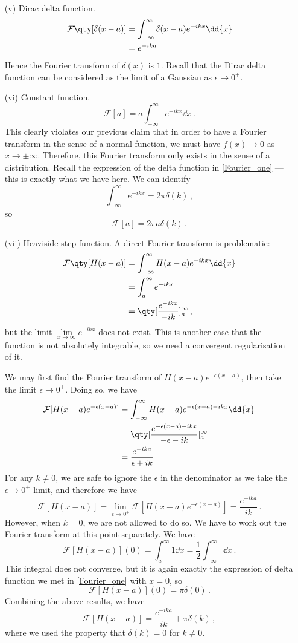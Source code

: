 \documentclass{article}
\theoremstyle{plain}\theoremheaderfont{\normalfont\itshape}\theorembodyfont{\rmfamily}\theoremseparator{.}\newtheorem*{rem}{Remark}\newtheorem*{ex}{Example}\newtheorem*{proof}{Proof}\newtheorem*{altp}{Alternative proof}
\theoremstyle{plain}\theoremheaderfont{\normalfont\bfseries}\theorembodyfont{\rmfamily}\theoremseparator{.}\newtheorem{thm}{Theorem}[section]\newtheorem{lem}[thm]{Lemma}\newtheorem{prop}[thm]{Proposition}\newtheorem*{cor}{Corollary}\newtheorem{defn}[thm]{Definition}\newtheorem{clm}[thm]{Claim}\newtheorem{clminproof}{Claim}
\theoremstyle{break}\theoremheaderfont{\normalfont\itshape}\theorembodyfont{\rmfamily}\theoremseparator{.\medskip}\newtheorem*{proofskip}{Proof}\newtheorem*{exs}{Examples}\newtheorem*{rems}{Remarks}
\theoremstyle{break}\theoremheaderfont{\normalfont\bfseries}\theorembodyfont{\rmfamily}\theoremseparator{.\medskip}\newtheorem{lemskip}[thm]{Lemma}\newtheorem{defnskip}[thm]{Definition}\newtheorem{propskip}[thm]{Proposition}\newtheorem{thmskip}[thm]{Theorem}
\numberwithin{equation}{section}
\begin{document}
\begin{itemize}
		\item[(v)] Dirac delta function.
		\begin{align*}
			\mathcal{F}\qty[\delta(x-a)]&=\int_{-\infty}^{\infty}\delta(x-a)e^{-ikx}\dd{x}\\
			&=e^{-ika}			
		\end{align*}
		Hence the Fourier transform of \(\delta(x)\) is \(1\). Recall that the Dirac delta function can be considered as the limit of a Gaussian as \(\epsilon\to 0^+\).

		\item[(vi)] Constant function.
		\[\mathcal{F}[a]=a\int_{-\infty}^{\infty}e^{-ikx}\dd{x}\,.\]
		This clearly violates our previous claim that in order to have a Fourier transform in the sense of a normal function, we must have \(f(x)\to 0\) as \(x\to\pm\infty\). Therefore, this Fourier transform only exists in the sense of a distribution. Recall the expression of the delta function in \cref{Fourier_one} --- this is exactly what we have here. We can identify
		\[\int_{-\infty}^{\infty}e^{-ikx}=2\pi\delta(k)\,,\]
		so
		\[\mathcal{F}[a]=2\pi a\delta(k)\,.\]
		
		\item[(vii)] Heaviside step function. A direct Fourier transform is problematic:
		\begin{align*}
			\mathcal{F}\qty[H(x-a)]&=\int_{-\infty}^{\infty}H(x-a)e^{-ikx}\dd{x}\\
			&=\int_{a}^{\infty}e^{-ikx}\\
			&=\qty[\frac{e^{-ikx}}{-ik}]_{a}^{\infty}\,,
		\end{align*}
		but the limit \(\lim\limits_{x\to\infty}e^{-ikx}\) does not exist. This is another case that the function is not absolutely integrable, so we need a convergent regularisation of it.
		
		We may first find the Fourier transform of \(H(x-a)e^{-\epsilon(x-a)}\), then take the limit \(\epsilon\to 0^+\). Doing so, we have
		\begin{align*}
			\mathcal{F}[H(x-a)e^{-\epsilon(x-a)}]&=\int_{-\infty}^{\infty}H(x-a)e^{-\epsilon(x-a)-ikx}\dd{x}\\
			&=\qty[\frac{e^{-\epsilon(x-a)-ikx}}{-\epsilon-ik}]_a^\infty\\
			&=\frac{e^{-ika}}{\epsilon+ik}
		\end{align*}
		For any \(k\ne 0\), we are safe to ignore the \(\epsilon\) in the denominator as we take the \(\epsilon\to 0^+\) limit, and therefore we have
		\[\mathcal{F}[H(x-a)]=\lim_{\epsilon\to 0^+}\mathcal{F}[H(x-a)e^{-\epsilon(x-a)}]=\frac{e^{-ika}}{ik}\,.\]
		However, when \(k=0\), we are not allowed to do so. We have to work out the Fourier transform at this point separately. We have
		\[\mathcal{F}[H(x-a)](0)=\int_{a}^{\infty}1\dd{x}=\frac{1}{2}\int_{-\infty}^{\infty}\dd{x}\,.\]
		This integral does not converge, but it is again exactly the expression of delta function we met in \cref{Fourier_one} with \(x=0\), so
		\[\mathcal{F}[H(x-a)](0)=\pi\delta(0)\,.\]
		Combining the above results, we have
		\[\mathcal{F}[H(x-a)]=\frac{e^{-ika}}{ik}+\pi\delta(k)\,,\]
		where we used the property that \(\delta(k)=0\) for \(k\ne 0\).


\end{itemize}
\end{document}
